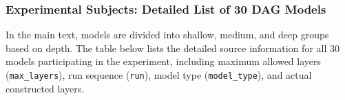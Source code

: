 \subsubsection{Experimental Subjects: Detailed List of 30 DAG Models}

In the main text, models are divided into shallow, medium, and deep groups based on depth. The table below lists the detailed source information for all 30 models participating in the experiment, including maximum allowed layers (\texttt{max\_layers}), run sequence (\texttt{run}), model type (\texttt{model\_type}), and actual constructed layers.

\begin{table}[htbp]
    \centering
    \caption{Source and Structural Information of the 30 Models Used in Experiment 3}
    \label{tab:exp3_models_list}
\end{table}
